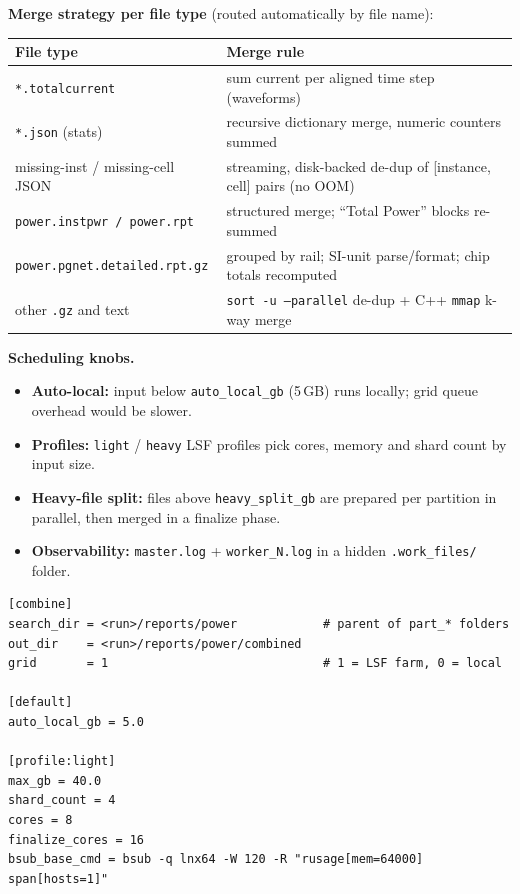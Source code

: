 \documentclass[11pt,a4paper]{article}
\newcommand{\fn}[1]{\texttt{#1}}                 %
\begin{document}
\textbf{Merge strategy per file type} (routed automatically by file name):
\begin{center}
\small
\begin{tabularx}{\linewidth}{@{}lX@{}}
\toprule
\textbf{File type} & \textbf{Merge rule}\\
\midrule
\fn{*.totalcurrent}               & sum current per aligned time step (waveforms)\\
\fn{*.json} (stats)               & recursive dictionary merge, numeric counters summed\\
missing-inst / missing-cell JSON  & streaming, disk-backed de-dup of [instance, cell] pairs (no OOM)\\
\fn{power.instpwr / power.rpt}    & structured merge; ``Total Power'' blocks re-summed\\
\fn{power.pgnet.detailed.rpt.gz}  & grouped by rail; SI-unit parse/format; chip totals recomputed\\
other \fn{.gz} and text           & \fn{sort -u --parallel} de-dup + C++ \fn{mmap} k-way merge\\
\bottomrule
\end{tabularx}
\end{center}

\textbf{Scheduling knobs.}
\begin{itemize}
  \item \textbf{Auto-local:} input below \fn{auto\_local\_gb} (5\,GB) runs locally; grid queue
        overhead would be slower.
  \item \textbf{Profiles:} \fn{light} / \fn{heavy} LSF profiles pick cores, memory and shard count
        by input size.
  \item \textbf{Heavy-file split:} files above \fn{heavy\_split\_gb} are prepared per partition in
        parallel, then merged in a finalize phase.
  \item \textbf{Observability:} \fn{master.log} + \fn{worker\_N.log} in a hidden \fn{.work\_files/}
        folder.
\end{itemize}

\needspace{7.5cm}
\begin{lstlisting}[caption={Trimmed \texttt{combine.cfg}}]
[combine]
search_dir = <run>/reports/power            # parent of part_* folders
out_dir    = <run>/reports/power/combined
grid       = 1                              # 1 = LSF farm, 0 = local

[default]
auto_local_gb = 5.0

[profile:light]
max_gb = 40.0
shard_count = 4
cores = 8
finalize_cores = 16
bsub_base_cmd = bsub -q lnx64 -W 120 -R "rusage[mem=64000] span[hosts=1]"
\end{lstlisting}
\end{document}
